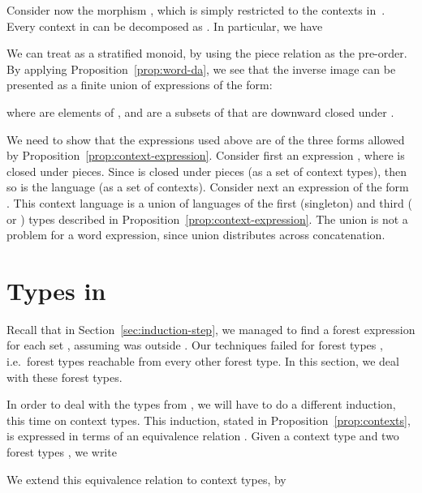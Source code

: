 \documentclass{LMCS}
\begin{document}
Consider now the morphism , which is simply 
restricted to the contexts in~.  Every context  in  can be
decomposed as . In particular, we have


We can treat  as a stratified monoid, by using the piece relation
 as the pre-order. By applying Proposition~\ref{prop:word-da}, we
see that the inverse image  can be presented as a
finite union of expressions of the form:
  
  where  are elements of , and  are
  a subsets of  that are downward closed under .

  We need to show that the expressions used above are of the three
  forms allowed by Proposition~\ref{prop:context-expression}.
  Consider first an expression , where  is closed under pieces. Since  is closed under
  pieces (as a set of context types), then so is the language  (as a set of contexts).  Consider next an
  expression of the form . This context language
  is a union of languages of the first (singleton) and third ( or ) types described in
  Proposition~\ref{prop:context-expression}.  The union is not a
  problem for a  word expression, since union distributes
  across concatenation.


















\section{Types in \texorpdfstring{}{Hbot}}
\label{sec:top-down}

\def\ordereq{\sim}
\def\order{\leq}

Recall that in Section~\ref{sec:induction-step}, we managed to find a
 forest expression for each set , assuming  was
outside . Our techniques failed for forest types , i.e.~forest types reachable from every other forest type.
In this section, we deal with these forest types.

In order to deal with the types from , we will have to do a different
induction, this time on context types.  This induction, stated in 
Proposition~\ref{prop:contexts}, is expressed in terms of an equivalence
relation .  Given a context type  and two forest
types , we write 

We extend this equivalence relation to context types, by
\end{document}
